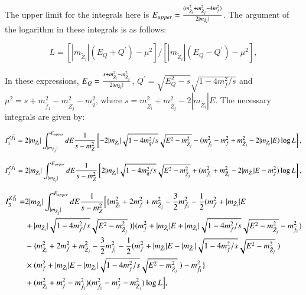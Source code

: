 \documentclass[final,3p,times,pdflatex]{elsarticle}
\begin{document}
The upper limit for the integrals here is $E_{upper} = {(m_{\tilde{Z}_i}^2 + m_{\tilde{Z}_j}^2 -4 m_{f}^2) \over 2|m_{\tilde{Z}_i}|}$. The argument of the logarithm in these integrals is as follows:

\begin{equation}
L = [|m_{\tilde{Z}_i}|(E_{Q} + Q^{'})- \mu^2]/[|m_{\tilde{Z}_i}|(E_{Q} - Q^{'}) - \mu^2],
\end{equation}

In these expressions, $E_{Q} = {s + m_{\tilde{Z}_i}^2 - m_{\tilde{Z}_j}^2 \over 2|m_{\tilde{Z}_i}|}$, $Q^{'} = \sqrt{E_{Q}^2 - s}\sqrt{1 - 4m_{f}^2/s}$ and $\mu^2 = s + m_{\tilde{f}_1}^2 - m_{\tilde{Z}_j}^2 - m_{q}^2$, where $s = m_{\tilde{Z}_i}^2 + m_{\tilde{Z}_j}^2 - 2|m_{\tilde{Z}_i}|E$. The necessary integrals are given by:

\begin{equation}
I_{1}^{Z \tilde{f}_1} = 2|m_{\tilde{Z}_i}|\int_{|m_{\tilde{Z}_j}|}^{E_{upper}} dE {1 \over s-m_{Z}^2}\left[-2|m_{\tilde{Z}_i}|\sqrt{1- 4m_{q}^2/s}\sqrt{E^2 - m_{\tilde{Z}_j}^2} - (m_{\tilde{f}_1}^2 - m_{f}^2 + m_{\tilde{Z}_j}^2 - 2|m_{\tilde{Z}_i}|E) \log L\right],
\end{equation}

\begin{equation}
I_{2}^{Z \tilde{f}_1} = 2|m_{\tilde{Z}_i}|\int_{|m_{\tilde{Z}_j}|}^{E_{upper}} dE {1 \over s-m_{Z}^2}\left[2|m_{\tilde{Z}_i}|\sqrt{1- 4m_{q}^2/s}\sqrt{E^2 - m_{\tilde{Z}_j}^2} + (m_{\tilde{f}_1}^2 + m_{\tilde{Z}_i}^2 - 2|m_{\tilde{Z}_i}|E - m_{f}^2 ) \log L\right]	,
\end{equation}

\begin{equation}
\begin{aligned}
I_{3}^{Z \tilde{f}_1} = & 2|m_{\tilde{Z}_i}|\int_{|m_{\tilde{Z}_j}|}^{E_{upper}} dE {1 \over s-m_{Z}^2}\Big[\{m_{\tilde{Z}_i}^2 + 2m_{f}^2 + m_{\tilde{Z}_j}^2 - {3 \over 2}m_{\tilde{f}_1}^2 - {1 \over 2}(m_{f}^2 + |m_{\tilde{Z}_i}|E \\ & + |m_{\tilde{Z}_i}|\sqrt{1-4m_{f}^2/s}\sqrt{E^2-m_{\tilde{Z}_j}^2}\ ) \} (m_{f}^2 + |m_{\tilde{Z}_i}|E + |m_{\tilde{Z}_i}|\sqrt{1-4m_{f}^2/s}\sqrt{E^2-m_{\tilde{Z}_j}^2} - m_{\tilde{f}_1}^2) \\ & - \{m_{\tilde{Z}_i}^2 + 2m_{f}^2 + m_{\tilde{Z}_j}^2 - {3 \over 2}m_{\tilde{f}_1}^2 - {1 \over 2}(m_{f}^2 + |m_{\tilde{Z}_i}|E - |m_{\tilde{Z}_i}|\sqrt{1-4m_{f}^2/s}\sqrt{E^2-m_{\tilde{Z}_j}^2}\ ) \\ & \times (m_{f}^2 + |m_{\tilde{Z}_i}|E - |m_{\tilde{Z}_i}|\sqrt{1-4m_{f}^2/s}\sqrt{E^2-m_{\tilde{Z}_j}^2}\ ) -m_{\tilde{f}_1}^2 \}\\ & + (m_{\tilde{Z}_i}^2 +m_{f}^2 - m_{\tilde{f}_1}^2)(m_{\tilde{f}_1}^2 - m_{f}^2 - m_{\tilde{Z}_j}^2) \log L\Big], 
\end{aligned}
\end{equation}
\end{document}
